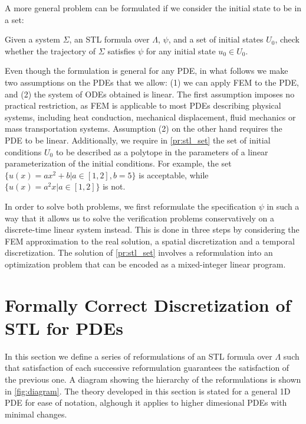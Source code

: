 \documentclass[oribibl]{llncs/llncs}
\begin{document}
A more general problem can be formulated if we consider the initial state to be
in a set:

\begin{problem}
\label{pr:stl_set}
    Given a system $\Sigma$, an STL formula over $\Lambda$, $\psi$, and a set of initial states
    $U_0$, check whether the trajectory of $\Sigma$ satisfies $\psi$ 
    for any initial state $u_0 \in U_0$.
\end{problem}

Even though the formulation is general for any PDE, in what follows we make two
assumptions on the PDEs that we allow: (1) we can apply FEM to the PDE, and (2)
the system of ODEs obtained is linear. The first assumption imposes no practical
restriction, as FEM is applicable to most PDEs describing physical systems,
including heat conduction, mechanical displacement, fluid mechanics or
mass transportation systems. Assumption (2) on the other hand requires the PDE
to be linear. Additionally, we require in \cref{pr:stl_set} the set of initial
conditions $U_0$ to be described as a polytope in the parameters of a
linear parameterization of the initial conditions. For example, the set $\{u(x)
= a x^2 + b | a \in [1,2], b = 5\}$ is acceptable, while $\{u(x) = a^2 x |
a \in [1,2]\}$ is not.

In order to solve both problems, we first reformulate the specification $\psi$
in such a way that it allows us to solve the verification problems
conservatively on a discrete-time linear system instead. This is done in three
steps by considering the FEM approximation to the real solution, a spatial
discretization and a temporal discretization. The solution of \cref{pr:stl_set}
involves a reformulation into an optimization problem that can be encoded as a
mixed-integer linear program.

\section{Formally Correct Discretization of STL for PDEs}
\label{sec:formally_correct_discretization_of_pdestl}

In this section we define a series of reformulations of an STL formula over
$\Lambda$ such that satisfaction of each successive reformulation guarantees the
satisfaction of the previous one. A diagram showing the hierarchy of the
reformulations is shown in \cref{fig:diagram}. The theory developed in this section is stated
for a general 1D PDE for ease of notation, alghough it applies to higher dimesional PDEs
with minimal changes.
\end{document}
